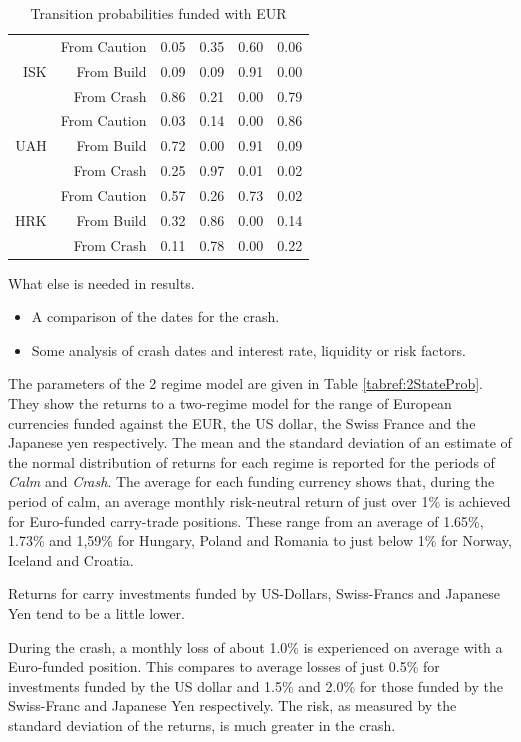 \documentclass[12pt, a4paper, oneside]{article} %
\begin{document}
\begin{table}[!h]
\begin{tabular}{rrrrrr}
\hline
\multirow{3}{*}{ISK}   & From Caution & 0.05 & 0.35 & 0.60 & 0.06 \\ 
   & From Build & 0.09 & 0.09 & 0.91 & 0.00 \\ 
   & From Crash & 0.86 & 0.21 & 0.00 & 0.79 \\ 
\hline
\multirow{3}{*}{UAH} & From Caution & 0.03 & 0.14 & 0.00 & 0.86 \\ 
   & From Build & 0.72 & 0.00 & 0.91 & 0.09 \\ 
   & From Crash & 0.25 & 0.97 & 0.01 & 0.02 \\ 
\hline
\multirow{3}{*}{HRK}  & From Caution & 0.57 & 0.26 & 0.73 & 0.02 \\ 
   & From Build  & 0.32 & 0.86 & 0.00 & 0.14 \\ 
   & From Crash & 0.11 & 0.78 & 0.00 & 0.22 \\ 
   \hline
\end{tabular}
\caption{Transition probabilities funded with EUR}
\label{tabref:3statetrans}
\end{table}


What else is needed in results.
\begin{itemize}
\item A comparison of the dates for the crash. 
\item Some analysis of crash dates and interest rate, liquidity or risk factors. 
\end{itemize}
 
  
The parameters of the 2 regime model are given in Table \ref{tabref:2StateProb}.  They show the returns to a two-regime model for the range of European currencies funded against the EUR, the US dollar, the Swiss France and the Japanese yen respectively.  The mean and the standard deviation of an estimate of the normal distribution of returns for each regime is reported for the periods of \emph{Calm} and \emph{Crash}.  The average for each funding currency shows that, during the period of calm, an average  monthly risk-neutral return of just over 1\% is achieved for Euro-funded carry-trade positions. These range from an average of 1.65\%, 1.73\% and 1,59\% for Hungary, Poland and Romania to just below 1\% for Norway, Iceland and Croatia. 

Returns for carry investments funded by US-Dollars, Swiss-Francs and Japanese Yen tend to be a little lower. 

During the crash, a monthly loss of about 1.0\% is experienced on average with a Euro-funded position.  This compares to average losses of just 0.5\% for investments funded by the US dollar and 1.5\% and 2.0\% for those funded by the Swiss-Franc and Japanese Yen respectively. The risk, as measured by the standard deviation of the  returns, is much greater in the crash.   
\end{document}
